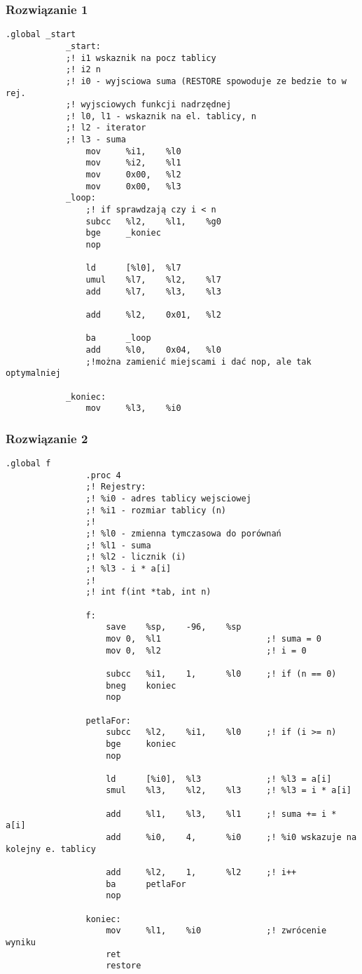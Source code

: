 		\subsubsection{Rozwiązanie 1}
			\begin{lstlisting}[language={[sparc]Assembler}]
			.global _start
			_start:
			;! i1 wskaznik na pocz tablicy
			;! i2 n
			;! i0 - wyjsciowa suma (RESTORE spowoduje ze bedzie to w rej.
			;! wyjsciowych funkcji nadrzędnej
			;! l0, l1 - wskaznik na el. tablicy, n
			;! l2 - iterator
			;! l3 - suma
				mov		%i1,	%l0			
				mov		%i2,	%l1			
				mov		0x00,	%l2
				mov		0x00,	%l3
			_loop:
				;! if sprawdzają czy i < n
				subcc	%l2,	%l1,	%g0
				bge		_koniec
				nop
			
				ld		[%l0],	%l7
				umul	%l7, 	%l2,	%l7
				add		%l7,	%l3, 	%l3
				
				add		%l2,	0x01,	%l2
				
				ba		_loop
				add		%l0,	0x04,	%l0
				;!można zamienić miejscami i dać nop, ale tak optymalniej
			
			_koniec:
				mov		%l3,	%i0
			\end{lstlisting}
		\subsubsection{Rozwiązanie 2}
			\begin{lstlisting}[language={[sparc]Assembler}]
				.global f
				.proc 4
				;! Rejestry:
				;! %i0 - adres tablicy wejsciowej
				;! %i1 - rozmiar tablicy (n)
				;!
				;! %l0 - zmienna tymczasowa do porównań
				;! %l1 - suma
				;! %l2 - licznik (i)
				;! %l3 - i * a[i]
				;!
				;! int f(int *tab, int n)
				
				f:
					save	%sp,	-96,	%sp
					mov	0,	%l1						;! suma = 0
					mov	0,	%l2						;! i = 0
				
					subcc	%i1,	1,		%l0		;! if (n == 0)
					bneg	koniec
					nop
				
				petlaFor:	
					subcc	%l2,	%i1,	%l0		;! if (i >= n)
					bge		koniec
					nop
				
					ld		[%i0],	%l3				;! %l3 = a[i]
					smul	%l3,	%l2,	%l3		;! %l3 = i * a[i]
					
					add		%l1,	%l3,	%l1		;! suma += i * a[i]
					add		%i0,	4,		%i0		;! %i0 wskazuje na kolejny e. tablicy
					
					add		%l2,	1,		%l2		;! i++
					ba		petlaFor
					nop
				
				koniec:
					mov		%l1,	%i0				;! zwrócenie wyniku
					ret
					restore
			\end{lstlisting}